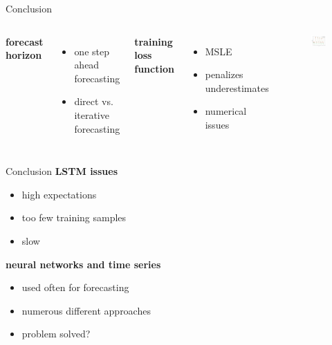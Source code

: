 \documentclass{beamer}
\begin{document}
  
  \begin{frame}{Conclusion}  
    \begin{columns}[c]
      \textbf{forecast horizon}
      \begin{itemize}
       \item one step ahead forecasting
       \item direct vs. iterative forecasting
      \end{itemize}
      
      \hspace{10pt}
      
      \textbf{training loss function}
      \begin{itemize}
       \item MSLE 
       \item penalizes underestimates
       \item numerical issues
      \end{itemize}

        \begin{figure}
         \includegraphics[width=1.0\textwidth]{images/msle_standardized_data_issue.png}
        \end{figure}
    \end{columns}
  \end{frame}
  
  
  \begin{frame}{Conclusion}
    \textbf{LSTM issues}
    \begin{itemize}
     \item high expectations
     \item too few training samples
     \item slow
    \end{itemize}
    
    \textbf{neural networks and time series}
    \begin{itemize}
     \item used often for forecasting
     \item numerous different approaches
     \item problem solved?
    \end{itemize}

  \end{frame}


\end{document}

